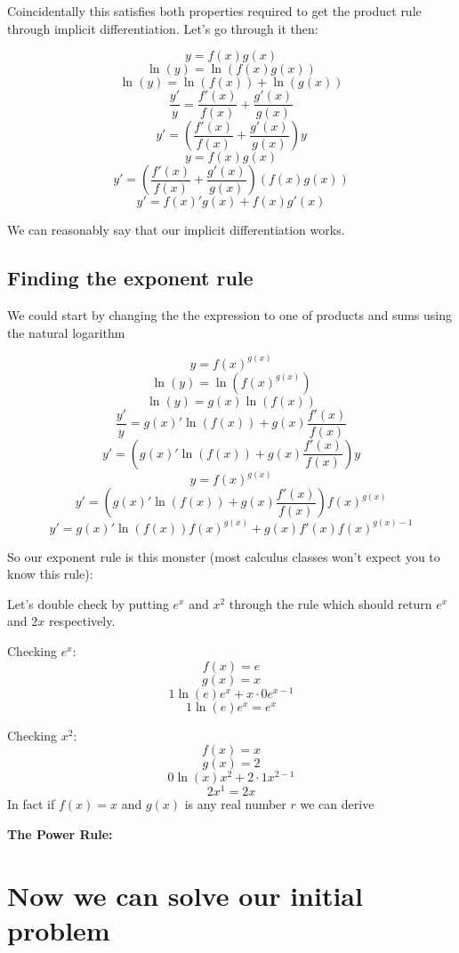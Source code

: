 \documentclass[12pt]{book}
\begin{document}
Coincidentally this satisfies both properties required to get the product rule through implicit differentiation. Let's go through it then:

$$y=f(x)g(x)$$
$$\ln(y)=\ln(f(x)g(x))$$
$$\ln(y)=\ln(f(x))+\ln(g(x))$$
$$\frac{y'}{y}=\frac{f'(x)}{f(x)} + \frac{g'(x)}{g(x)}$$
$$y'=\left(\frac{f'(x)}{f(x)} + \frac{g'(x)}{g(x)}\right)y$$
$$y=f(x)g(x)$$
$$y'=\left(\frac{f'(x)}{f(x)} + \frac{g'(x)}{g(x)}\right)(f(x)g(x))$$
$$y'=f(x)'g(x)+f(x)g'(x)$$

We can reasonably say that our implicit differentiation works.

\section{Finding the exponent rule}
We could start by changing the the expression to one of products and sums using the natural logarithm

$$y=f(x)^{g(x)}$$
$$\ln(y)=\ln\left(f(x)^{g(x)}\right)$$
$$\ln(y)=g(x)\ln(f(x))$$
$$\frac{y'}{y}=g(x)'\ln(f(x)) + g(x)\frac{f'(x)}{f(x)}$$
$$y'=\left(g(x)'\ln(f(x)) + g(x)\frac{f'(x)}{f(x)}\right)y$$
$$y=f(x)^{g(x)}$$
$$y'=\left(g(x)'\ln(f(x)) + g(x)\frac{f'(x)}{f(x)}\right)f(x)^{g(x)}$$
$$y'=g(x)'\ln(f(x))f(x)^{g(x)} + g(x)f'(x)f(x)^{g(x)-1}$$

So our exponent rule is this monster (most calculus classes won't expect you to know this rule):
\begin{center}
\end{center}

Let's double check  by putting $e^x$ and $x^2$ through the rule which should return $e^x$ and $2x$ respectively.

Checking $e^x$:
$$f(x) = e$$
$$g(x) = x$$
$$1\ln(e)e^x + x \cdot 0e^{x-1}$$
$$1\ln(e)e^x = e^x$$

Checking $x^2$:
$$f(x) = x$$
$$g(x) = 2$$
$$0\ln(x)x^2 + 2 \cdot 1x^{2-1}$$
$$2x^1 = 2x$$
In fact if $f(x) = x$ and $g(x)$ is any real number $r$ we can derive
\begin{center}
	\textbf{The Power Rule:}
\end{center}

\begin{center}
\end{center}

\chapter{Now we can solve our initial problem}
\end{document}
